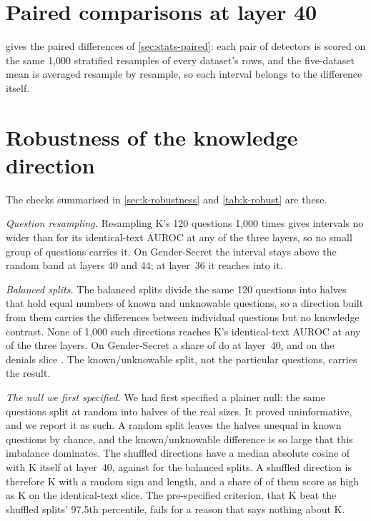 \begin{table}[h]
\centering
\small
\caption{The sycophancy contrast (5 v 5): zero-shot AUROC and mean off-diagonal AUROC as a probe
feature.}
\label{tab:syc}
\fittable{}
\end{table}

\section*{Paired comparisons at layer 40}

 gives the paired differences of \cref{sec:stats-paired}: each pair of detectors is
scored on the same 1,000 stratified resamples of every dataset's rows, and the five-dataset mean is
averaged resample by resample, so each interval belongs to the difference itself.

\begin{table}[h]
\centering
\small
\caption{Paired AUROC differences at layer 40, with 95\% row-bootstrap intervals.}
\label{tab:k-paired}
\fittable{}
\end{table}

\section*{Robustness of the knowledge direction}

The checks summarised in \cref{sec:k-robustness} and \cref{tab:k-robust} are these.

\emph{Question resampling.} Resampling K's 120 questions 1,000 times gives intervals no wider than
 for its identical-text AUROC at any of the three layers, so no small group of
questions carries it. On Gender-Secret the interval stays above the random band at layers 40 and 44;
at layer~36 it reaches into it.

\emph{Balanced splits.} The balanced splits divide the same 120 questions into halves that hold equal
numbers of known and unknowable questions, so a direction built from them carries the differences
between individual questions but no knowledge contrast. None of 1,000 such directions reaches K's
identical-text AUROC at any of the three layers. On Gender-Secret a share of 
do at layer~40, and on the denials slice . The known/unknowable split, not
the particular questions, carries the result.

\emph{The null we first specified.} We had first specified a plainer null: the same questions split at
random into halves of the real sizes. It proved uninformative, and we report it as such. A random split
leaves the halves unequal in known questions by chance, and the known/unknowable difference is so large
that this imbalance dominates. The shuffled directions have a median absolute cosine of
 with K itself at layer~40, against  for the balanced splits.
A shuffled direction is therefore K with a random sign and length, and a share of
 of them score as high as K on the identical-text slice. The pre-specified
criterion, that K beat the shuffled splits' 97.5th percentile, fails for a reason that says nothing
about K.

